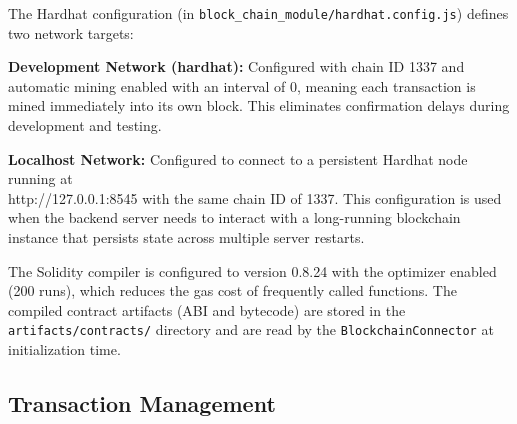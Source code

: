 The Hardhat configuration (in \texttt{block\_chain\_module/hardhat.config.js}) defines two network targets:

\textbf{Development Network (hardhat):} Configured with chain ID 1337 and automatic mining enabled with an interval of 0, meaning each transaction is mined immediately into its own block. This eliminates confirmation delays during development and testing.

\textbf{Localhost Network:} Configured to connect to a persistent Hardhat node running at \\{http://127.0.0.1:8545} with the same chain ID of 1337. This configuration is used when the backend server needs to interact with a long-running blockchain instance that persists state across multiple server restarts.

The Solidity compiler is configured to version 0.8.24 with the optimizer enabled (200 runs), which reduces the gas cost of frequently called functions. The compiled contract artifacts (ABI and bytecode) are stored in the \texttt{artifacts/contracts/} directory and are read by the \texttt{BlockchainConnector} at initialization time.

\subsection{Transaction Management}

